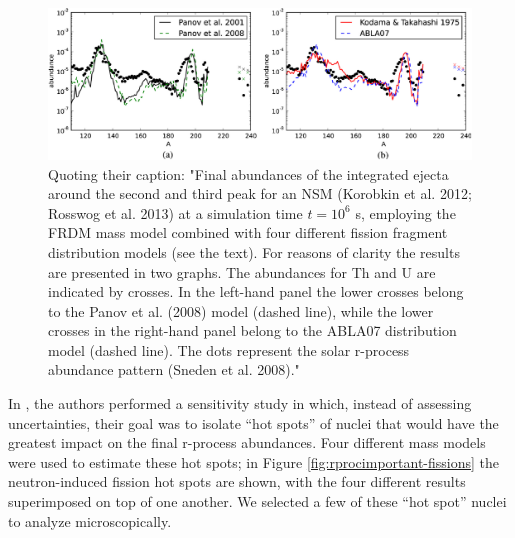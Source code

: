 \begin{figure}
	\centering
	\includegraphics[width=0.9\linewidth]{TeX_files/rProc_abundances}
	\caption[Final r-process abundances for a neutron star merger scenario with different fission fragment distributions.]{Quoting their caption: "Final abundances of the integrated ejecta around the second and third peak for an NSM (Korobkin et al. 2012; Rosswog et al. 2013) at a simulation time $t={10}^{6}$ s, employing the FRDM mass model combined with four different fission fragment distribution models (see the text). For reasons of clarity the results are presented in two graphs. The abundances for Th and U are indicated by crosses. In the left-hand panel the lower crosses belong to the Panov et al. (2008) model (dashed line), while the lower crosses in the right-hand panel belong to the ABLA07 distribution model (dashed line). The dots represent the solar r-process abundance pattern (Sneden et al. 2008)." \cite{Eichler2015}}
	\label{fig:rprocabundances}
\end{figure}

In \cite{Vassh2018}, the authors performed a sensitivity study in which, instead of assessing uncertainties, their goal was to isolate ``hot spots'' of nuclei that would have the greatest impact on the final r-process abundances. Four different mass models were used to estimate these hot spots; in Figure \ref{fig:rprocimportant-fissions} the neutron-induced fission hot spots are shown, with the four different results superimposed on top of one another. We selected a few of these ``hot spot'' nuclei to analyze microscopically.

